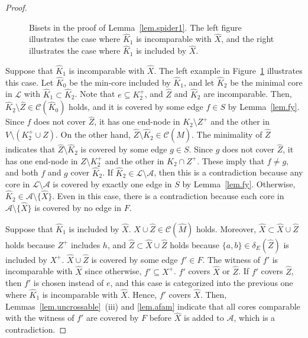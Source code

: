 \documentclass[11pt]{article}
\newcommand{\Afam}{\mathcal{A}}
\newcommand{\Cfam}{\mathcal{C}}
\newcommand{\Lfam}{\mathcal{L}}
\begin{document}
\begin{proof}
\begin{figure}[th]
  \caption{Bisets in the proof of Lemma~\ref{lem.spider1}. The left
  figure illustrates the case where $\hat{K}_1$ is incomparable with
  $\hat{X}$, and
  the right illustrates the case where $\hat{K}_1$ is included by $\hat{X}$.}
  \label{fig.spider1}
 \end{figure}

 Suppose that $\hat{K}_1$ is incomparable with $\hat{X}$.
 The left example in Figure~\ref{fig.spider1} illustrates this case.
 Let $\hat{K}_0$ be the min-core included by $\hat{K}_1$,
 and let $\hat{K}_2$ be the minimal core in $\Lfam$ with
 $\hat{K}_1\subset \hat{K}_2$.
 Note that $e \subseteq K^+_2$, and
 $\hat{Z}$ and $\hat{K}_2$ are incomparable.
 Then, $\hat{K}_2\setminus \hat{Z} \in \Cfam(\hat{K}_0)$ holds, and 
 it is covered by some edge $f\in S$ by Lemma~\ref{lem.fy}.
 Since $f$ does not cover $\hat{Z}$, it has one end-node in $K_2 \setminus
 Z^+$ and the other in $V \setminus (K^+_2 \cup Z)$.
 On the other hand, $\hat{Z}\setminus \hat{K}_2 \in \Cfam(\hat{M})$.
 The minimality of $\hat{Z}$ indicates that $\hat{Z}\setminus \hat{K}_2$
 is covered by some edge $g \in S$.
 Since $g$ does not cover $\hat{Z}$,
 it has one end-node in $Z\setminus K^+_2$ and the other in $K_2\cap Z^+$.
 These imply that $f\neq g$, and both $f$ and $g$ cover $\hat{K}_2$.
 If $\hat{K}_2 \in \Lfam\setminus \Afam$, then this is a contradiction because
 any core in $\Lfam\setminus \Afam$
 is covered by exactly one edge in $S$ by Lemma~\ref{lem.fy}.
 Otherwise, $\hat{K}_2 \in \Afam \setminus \{\hat{X}\}$.
 Even in this case, there is a contradiction because each core in $\Afam
 \setminus \{\hat{X}\}$ is covered by no edge in $F$.

 Suppose that $\hat{K}_1$ is included by $\hat{X}$.
 $\hat{X} \cup \hat{Z} \in \Cfam(\hat{M})$ holds.
 Moreover, $\hat{X}\subset \hat{X} \cup \hat{Z}$ holds
 because $Z^+$ includes $h$, 
 and $\hat{Z}\subset \hat{X} \cup \hat{Z}$ holds
 because $\{a,b\} \in \delta_E(\hat{Z})$ is included by $X^+$.
 $\hat{X}\cup \hat{Z}$ is covered by some edge $f' \in F$.
 The witness of $f'$ is incomparable with $\hat{X}$
 since otherwise, $f' \subseteq X^+$.
 $f'$ covers $\hat{X}$ or $\hat{Z}$.
 If $f'$ covers $\hat{Z}$,
 then $f'$ is chosen instead of $e$, and this case is categorized into
 the previous one where $\hat{K}_1$ is incomparable with $\hat{X}$.
 Hence, $f'$ covers $\hat{X}$. Then,
 Lemmas~\ref{lem.uncrossable}~(iii) and \ref{lem.afam} indicate that
 all cores comparable with the witness of
 $f'$ 
 are covered by $F$ before $\hat{X}$ is added to $\Afam$,
 which is
 a contradiction.
\end{proof}
\end{document}
